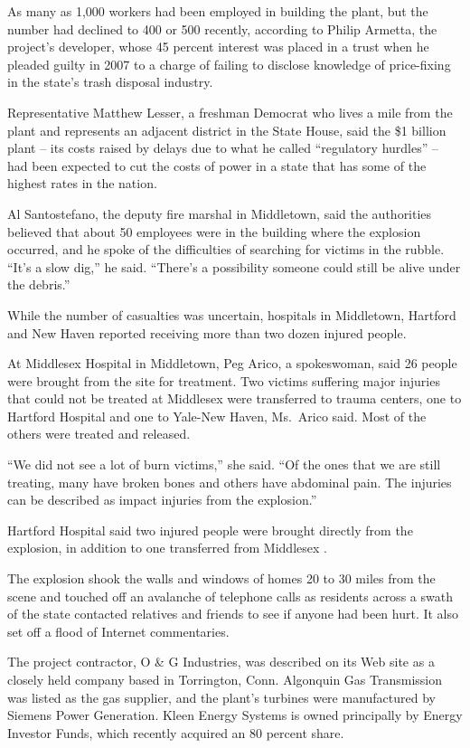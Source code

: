 ﻿\documentclass[12pt]{article}
\begin{document}
As many as 1,000 workers had been employed in building the plant, but the number had declined to 400
or 500 recently, according to Philip Armetta, the project's developer, whose 45 percent interest was
placed in a trust when he pleaded guilty in 2007 to a charge of failing to disclose knowledge of
price-fixing in the state's trash disposal industry.

Representative Matthew Lesser, a freshman Democrat who lives a mile from the plant and represents an
adjacent district in the State House, said the \$1 billion plant -- its costs raised by delays due
to what he called ``regulatory hurdles'' -- had been expected to cut the costs of power in a state
that has some of the highest rates in the nation.

Al Santostefano, the deputy fire marshal in Middletown, said the authorities believed that about 50
employees were in the building where the explosion occurred, and he spoke of the difficulties of
searching for victims in the rubble. ``It's a slow dig,'' he said. ``There's a possibility someone
could still be alive under the debris.''

While the number of casualties was uncertain, hospitals in Middletown, Hartford and New Haven
reported receiving more than two dozen injured people.

At Middlesex Hospital in Middletown, Peg Arico, a spokeswoman, said 26 people were brought from the
site for treatment. Two victims suffering major injuries that could not be treated at Middlesex were
transferred to trauma centers, one to Hartford Hospital and one to Yale-New Haven, Ms.~Arico said.
Most of the others were treated and released.

``We did not see a lot of burn victims,'' she said. ``Of the ones that we are still treating, many
have broken bones and others have abdominal pain. The injuries can be described as impact injuries
from the explosion.''

Hartford Hospital said two injured people were brought directly from the explosion, in addition to
one transferred from Middlesex .

The explosion shook the walls and windows of homes 20 to 30 miles from the scene and touched off an
avalanche of telephone calls as residents across a swath of the state contacted relatives and
friends to see if anyone had been hurt. It also set off a flood of Internet commentaries.

The project contractor, O \& G Industries, was described on its Web site as a closely held company
based in Torrington, Conn. Algonquin Gas Transmission was listed as the gas supplier, and the
plant's turbines were manufactured by Siemens Power Generation. Kleen Energy Systems is owned
principally by Energy Investor Funds, which recently acquired an 80 percent share.
\end{document}
